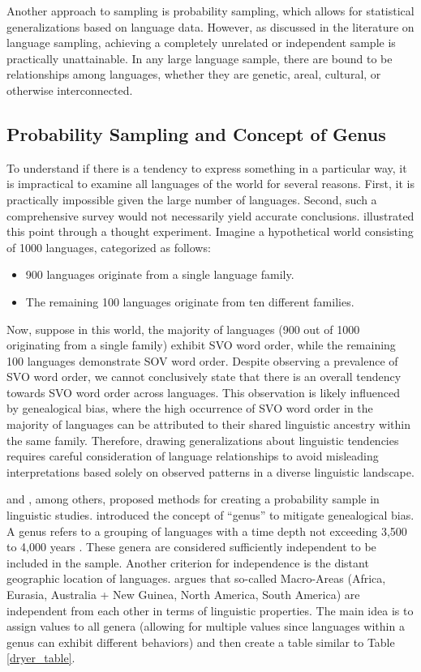 Another approach to sampling is probability sampling, which allows for statistical generalizations based on language data. However, as discussed in the literature on language sampling, achieving a completely unrelated or independent sample is practically unattainable. In any large language sample, there are bound to be relationships among languages, whether they are genetic, areal, cultural, or otherwise interconnected.

\subsection{Probability Sampling and Concept of Genus}

To understand if there is a tendency to express something in a particular way, it is impractical to examine all languages of the world for several reasons. First, it is practically impossible given the large number of languages. Second, such a comprehensive survey would not necessarily yield accurate conclusions. \cite{dryer1989large} illustrated this point through a thought experiment. Imagine a hypothetical world consisting of 1000 languages, categorized as follows:

\begin{itemize}
	\item 900 languages originate from a single language family.
	\item The remaining 100 languages originate from ten different families.
\end{itemize}

Now, suppose in this world, the majority of languages (900 out of 1000 originating from a single family) exhibit SVO word order, while the remaining 100 languages demonstrate SOV word order. Despite observing a prevalence of SVO word order, we cannot conclusively state that there is an overall tendency towards SVO word order across languages. This observation is likely influenced by genealogical bias, where the high occurrence of SVO word order in the majority of languages can be attributed to their shared linguistic ancestry within the same family. Therefore, drawing generalizations about linguistic tendencies requires careful consideration of language relationships to avoid misleading interpretations based solely on observed patterns in a diverse linguistic landscape.


\citet{dryer1989large} and \citet{bickel2008refined}, among others, proposed methods for creating a probability sample in linguistic studies. \citet{dryer1989large} introduced the concept of ``genus'' to mitigate genealogical bias. A genus refers to a grouping of languages with a time depth not exceeding 3,500 to 4,000 years \citep{dryer1989large}. These genera are considered sufficiently independent to be included in the sample. Another criterion for independence is the distant geographic location of languages. \citet{dryer1989large} argues that so-called Macro-Areas (Africa, Eurasia, Australia + New Guinea, North America, South America) are independent from each other in terms of linguistic properties. The main idea is to assign values to all genera (allowing for multiple values since languages within a genus can exhibit different behaviors) and then create a table similar to Table \ref{dryer_table}.

